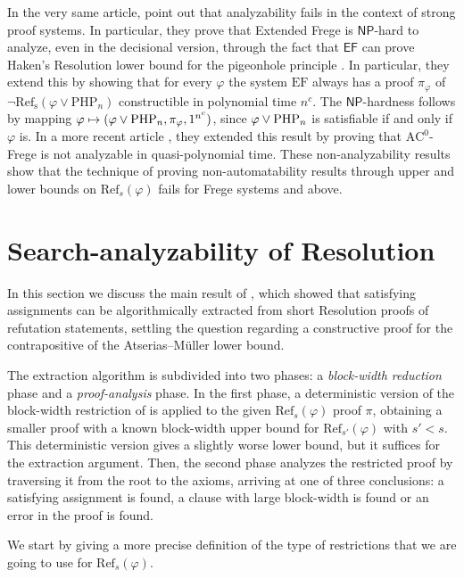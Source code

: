 In the very same article, \textcite{pap} point out that analyzability fails in the context of strong proof systems. In particular, they prove that Extended Frege is $\mathsf{NP}$-hard to analyze, even in the decisional version, through the fact that $\mathsf{EF}$ can prove \cite{cook_pitassi} Haken's Resolution lower bound for the pigeonhole principle \cite{haken}. In particular, they extend this by showing that for every $\varphi$ the system $\mathrm{EF}$ always has a proof $\pi_\varphi$ of $\lnot \mathrm{Ref_s}(\varphi \lor \mathrm{PHP}_n)$ constructible in polynomial time $n^c$. The $\mathsf{NP}$-hardness follows by mapping $\varphi \mapsto (\varphi \lor \mathrm{PHP}_n, \pi_\varphi, 1^{n^c})$, since $\varphi \lor \mathrm{PHP}_n$ is satisfiable if and only if $\varphi$ is. In a more recent article \cite{pap_2}, they extended this result by proving that $\mathrm{AC}^0$-Frege is not analyzable in quasi-polynomial time. These non-analyzability results show that the technique of proving non-automatability results through upper and lower bounds on $\mathrm{Ref}_s(\varphi)$ fails for Frege systems and above.

\section{Search-analyzability of Resolution}
\label{sec:fpap}

In this section we discuss the main result of \cite{pap}, which showed that satisfying assignments can be algorithmically extracted from short Resolution proofs of refutation statements, settling the question regarding a constructive proof for the contrapositive of the Atserias--Müller lower bound.

The extraction algorithm is subdivided into two phases: a \textit{block-width reduction} phase and a \textit{proof-analysis} phase. In the first phase, a deterministic version of the block-width restriction of  is applied to the given $\mathrm{Ref}_s(\varphi)$ proof $\pi$, obtaining a smaller proof with a known block-width upper bound for $\mathrm{Ref}_{s'}(\varphi)$ with $s' < s$. This deterministic version gives a slightly worse lower bound, but it suffices for the extraction argument. Then, the second phase analyzes the restricted proof by traversing it from the root to the axioms, arriving at one of three conclusions: a satisfying assignment is found, a clause with large block-width is found or an error in the proof is found.

We start by giving a more precise definition of the type of restrictions that we are going to use for $\mathrm{Ref}_s(\varphi)$.

